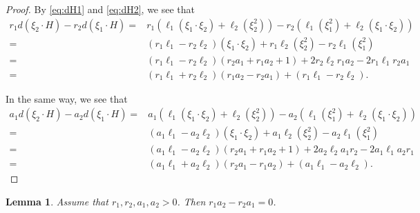 \documentclass[10pt]{amsart}
\numberwithin{equation}{section}
\theoremstyle{plain}
\newtheorem{lem}[thm]{Lemma}
\theoremstyle{definition}
\theoremstyle{remark}
\begin{document}
\begin{proof}
By \eqref{eq:dH1} and \eqref{eq:dH2}, we see that
\begin{equation}
\begin{split}
r_1 d(\xi_2 \cdot H)-r_2 d (\xi_1 \cdot H)=&
r_1(\ell_1 (\xi_1 \cdot \xi_2)+\ell_2 (\xi_2^2))-r
_2(\ell_1 (\xi_1^2)+\ell_2 (\xi_1 \cdot \xi_2))\\
=& (r_1 \ell_1-r_2 \ell_2)(\xi_1 \cdot \xi_2)+r_1 \ell_2 (\xi_2^2)-r_2 \ell_1 (\xi_1^2)\\
=& (r_1 \ell_1-r_2 \ell_2)(r_2 a_1+r_1 a_2+1)+2r_2 \ell_2 r_1 a_2-2r_1 \ell_1 r_2 a_1\\
=& (r_1 \ell_1+r_2 \ell_2)(r_1 a_2-r_2 a_1)+(r_1 \ell_1-r_2 \ell_2).
\end{split}
\end{equation}

In the same way, we see that
\begin{equation}
\begin{split}
a_1 d(\xi_2 \cdot H)-a_2 d (\xi_1 \cdot H)=&
a_1(\ell_1 (\xi_1 \cdot \xi_2)+\ell_2 (\xi_2^2))-
a_2(\ell_1 (\xi_1^2)+\ell_2 (\xi_1 \cdot \xi_2))\\
=& (a_1 \ell_1-a_2 \ell_2)(\xi_1 \cdot \xi_2)+a_1 \ell_2 (\xi_2^2)-a_2 \ell_1 (\xi_1^2)\\
=& (a_1 \ell_1-a_2 \ell_2)(r_2 a_1+r_1 a_2+1)+2a_2 \ell_2 a_1 r_2-2a_1 \ell_1 a_2 r_1\\
=& (a_1 \ell_1+a_2 \ell_2)(r_2 a_1-r_1 a_2)+(a_1 \ell_1-a_2 \ell_2).
\end{split}
\end{equation}
\end{proof}



\begin{lem}\label{lem:r_1a_2-r_2a_1=0}
Assume that $r_1,r_2,a_1,a_2>0$.
Then $r_1 a_2-r_2 a_1=0$.
\end{lem}
\end{document}
